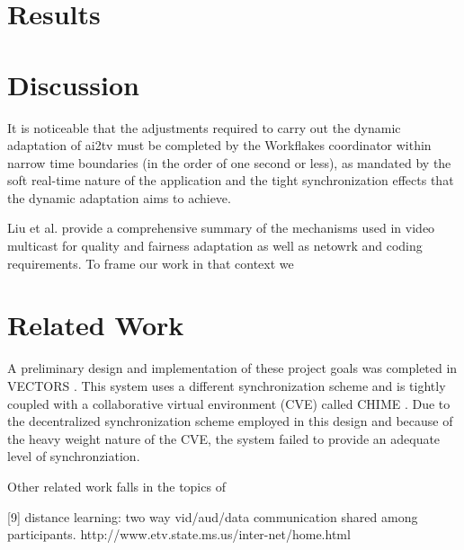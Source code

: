 \documentclass{sig-alternate}
\begin{document}

\section{Results} \label{results}



\section{Discussion} \label{discussion}

It is noticeable that the adjustments required to carry out the
dynamic adaptation of ai2tv must be completed by the Workflakes
coordinator within narrow time boundaries (in the order of one second
or less), as mandated by the soft real-time nature of the application
and the tight synchronization effects that the dynamic adaptation aims
to achieve.


Liu et al. provide a comprehensive summary of the mechanisms used in
video multicast for quality and fairness adaptation as well as netowrk
and coding requirements.  To frame our work in that context we


\section{Related Work} \label{related}

A preliminary design and implementation of these project goals was
completed in VECTORS \cite{SUHIT}.  This system uses a different
synchronization scheme and is tightly coupled with a collaborative
virtual environment (CVE) called CHIME \cite{CHIME}.  Due to the
decentralized synchronization scheme employed in this design and
because of the heavy weight nature of the CVE, the system failed to
provide an adequate level of synchronziation.

Other related work falls in the topics of

[9] distance learning: two way vid/aud/data communication shared among
participants.
http://www.etv.state.ms.us/inter-net/home.html
\end{document}
